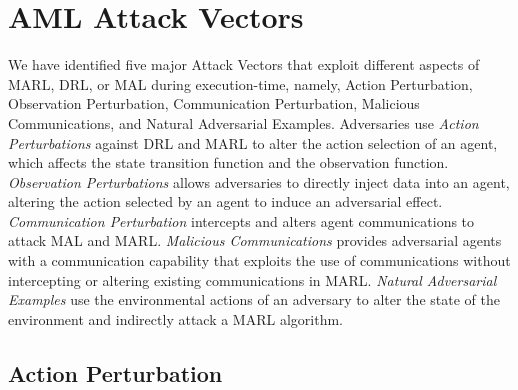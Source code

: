 \documentclass[conference,compsoc]{IEEEtran}
\begin{document}

\section{AML Attack Vectors}
\label{sec:aml_att_vec}

We have identified five major Attack Vectors that exploit different aspects of MARL, DRL, or MAL during execution-time, namely, Action Perturbation, Observation Perturbation, Communication Perturbation, Malicious Communications, and Natural Adversarial Examples. Adversaries use \textit{Action Perturbations} against DRL and MARL to alter the action selection of an agent, which affects the state transition function and the observation function. \textit{Observation Perturbations} allows adversaries to directly inject data into an agent, altering the action selected by an agent to induce an adversarial effect. \textit{Communication Perturbation} intercepts and alters agent communications to attack MAL and MARL. \textit{Malicious Communications} provides adversarial agents with a communication capability that exploits the use of communications without intercepting or altering existing communications in MARL. \textit{Natural Adversarial Examples} use the environmental actions of an adversary to alter the state of the environment and indirectly attack a MARL algorithm.

\subsection{Action Perturbation}
\end{document}
